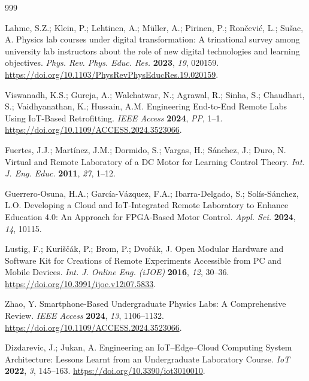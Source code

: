 \documentclass[sensors,article,submit,pdftex]{Definitions/mdpi}
\begin{document}
\begin{thebibliography}{999}

Lahme, S.Z.; Klein, P.; Lehtinen, A.; M\"uller, A.; Pirinen, P.; Ron\v{c}evi\'c, L.; Su\v{s}ac, A.
Physics lab courses under digital transformation: A trinational survey among university lab instructors about the role of new digital technologies and learning objectives.
\textit{Phys. Rev. Phys. Educ. Res.} \textbf{2023}, \textit{19}, 020159.
\href{https://doi.org/10.1103/PhysRevPhysEducRes.19.020159}{https://doi.org/10.1103/PhysRevPhysEducRes.19.020159}.

Viswanadh, K.S.; Gureja, A.; Walchatwar, N.; Agrawal, R.; Sinha, S.; Chaudhari, S.; Vaidhyanathan, K.; Hussain, A.M.
Engineering End-to-End Remote Labs Using IoT-Based Retrofitting.
\textit{IEEE Access} \textbf{2024}, \textit{PP}, 1--1.
\href{https://doi.org/10.1109/ACCESS.2024.3523066}{https://doi.org/10.1109/ACCESS.2024.3523066}.

Fuertes, J.J.; Mart\'inez, J.M.; Dormido, S.; Vargas, H.; S\'anchez, J.; Duro, N.
Virtual and Remote Laboratory of a DC Motor for Learning Control Theory.
\textit{Int. J. Eng. Educ.} \textbf{2011}, \textit{27}, 1--12.

Guerrero-Osuna, H.A.; Garc\'ia-V\'azquez, F.A.; Ibarra-Delgado, S.; Sol\'is-S\'anchez, L.O.
Developing a Cloud and IoT-Integrated Remote Laboratory to Enhance Education 4.0: An Approach for FPGA-Based Motor Control.
\textit{Appl. Sci.} \textbf{2024}, \textit{14}, 10115.

Lustig, F.; Kuri\v{s}\v{c}\'ak, P.; Brom, P.; Dvo\v{r}\'ak, J.
Open Modular Hardware and Software Kit for Creations of Remote Experiments Accessible from PC and Mobile Devices.
\textit{Int. J. Online Eng. (iJOE)} \textbf{2016}, \textit{12}, 30--36.
\href{https://doi.org/10.3991/ijoe.v12i07.5833}{https://doi.org/10.3991/ijoe.v12i07.5833}.

Zhao, Y.
Smartphone-Based Undergraduate Physics Labs: A Comprehensive Review.
\textit{IEEE Access} \textbf{2024}, \textit{13}, 1106--1132.
\href{https://doi.org/10.1109/ACCESS.2024.3523066}{https://doi.org/10.1109/ACCESS.2024.3523066}.

Dizdarevic, J.; Jukan, A.
Engineering an IoT--Edge--Cloud Computing System Architecture: Lessons Learnt from an Undergraduate Laboratory Course.
\textit{IoT} \textbf{2022}, \textit{3}, 145--163.
\href{https://doi.org/10.3390/iot3010010}{https://doi.org/10.3390/iot3010010}.


\end{thebibliography}
\end{document}

